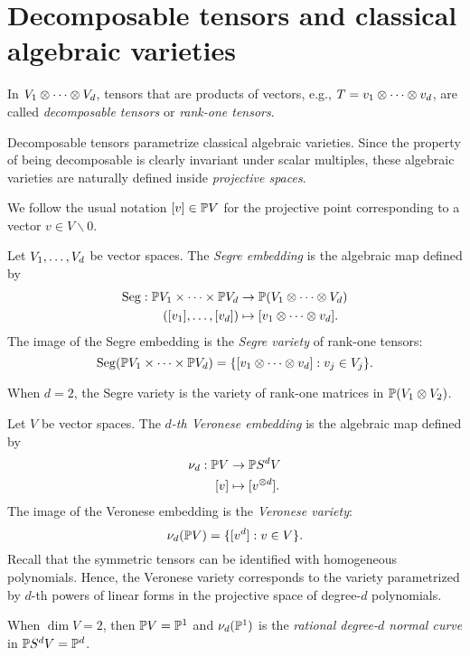 \section{Decomposable tensors and classical algebraic varieties}
\label{introduction-section-decomposable_tensors}
\begin{definition}\label{introduction-definition-decomposable_tensor}
    In $V_1\otimes \cdots \otimes V_d$, tensors that are products of vectors, e.g., $T = v_1 \otimes \cdots \otimes v_d$, are called \emph{decomposable tensors} or \emph{rank-one tensors}.
\end{definition}
Decomposable tensors parametrize classical algebraic varieties. Since the property of being decomposable is clearly invariant under scalar multiples, these algebraic varieties are naturally defined inside \emph{projective spaces}.

We follow the usual notation $[v] \in \mathbb{P} V$ for the projective point corresponding to a vector $v \in V \smallsetminus 0$.

\begin{definition}
\label{introduction-definition-Segre}
Let $V_1 , \ldots , V_d$ be vector spaces. The \emph{Segre embedding} is the algebraic map defined by 
\begin{align*}
\mathrm{Seg}: \mathbb{P} V_1 \times \cdots \times \mathbb{P} V_d &\to \mathbb{P} (V_1 \otimes \cdots \otimes V_d) \\
([v_1] , \ldots , [v_d]) &\mapsto [v_1 \otimes \cdots \otimes v_d].
\end{align*}
The image of the Segre embedding is the \emph{Segre variety} of rank-one tensors:
\[
\mathrm{Seg}( \mathbb{P} V_1 \times \cdots \times \mathbb{P} V_d) =\{ [v_1 \otimes \cdots \otimes v_d] : v_j \in V_j\}.
\]
\end{definition}
When $d = 2$, the Segre variety is the variety of rank-one matrices in $\mathbb{P} (V_1 \otimes V_2)$.

\begin{definition}
\label{introduction-definition-Veronese}
Let $V$ be vector spaces. The \emph{$d$-th Veronese embedding} is the algebraic map defined by 
\begin{align*}
    \nu_d : \mathbb{P} V &\to \mathbb{P} S^d V \\
    [v] &\mapsto [v^{\otimes d}].
\end{align*}
The image of the Veronese embedding is the \emph{Veronese variety}:
\[
    \nu_d( \mathbb{P} V ) =\{ [v^d] :  v \in V\}.
\]
Recall that the symmetric tensors can be identified with homogeneous polynomials. Hence, the Veronese variety corresponds to the variety parametrized by $d$-th powers of linear forms in the projective space of degree-$d$ polynomials. 

When $\dim V = 2$, then $\mathbb{P} V = \mathbb{P}^1$ and $\nu_d( \mathbb{P}^1)$ is the \emph{rational degree-$d$ normal curve} in $\mathbb{P} S^d V = \mathbb{P}^d$.
\end{definition}

